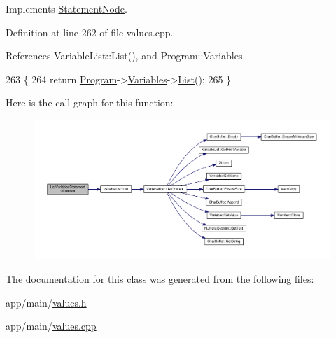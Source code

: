 Implements \hyperlink{classStatementNode_a721589622c930c010927b9a9c55b173e}{Statement\+Node}.



Definition at line 262 of file values.\+cpp.



References Variable\+List\+::\+List(), and Program\+::\+Variables.


\begin{DoxyCode}
263 \{
264     \textcolor{keywordflow}{return} \hyperlink{classProgram}{Program}->\hyperlink{classProgram_a1d4f53befb0270e64c91c24d14061188}{Variables}->\hyperlink{classVariableList_a8ddefb92c0c2f18f096f0fc4363d5af6}{List}();
265 \}
\end{DoxyCode}


Here is the call graph for this function\+:
\nopagebreak
\begin{figure}[H]
\begin{center}
\leavevmode
\includegraphics[width=350pt]{d7/d64/classListVariablesStatement_a2ca734439e1c118b8b62d550baac8dc0_cgraph}
\end{center}
\end{figure}




The documentation for this class was generated from the following files\+:\begin{DoxyCompactItemize}
\item 
app/main/\hyperlink{values_8h}{values.\+h}\item 
app/main/\hyperlink{values_8cpp}{values.\+cpp}\end{DoxyCompactItemize}
